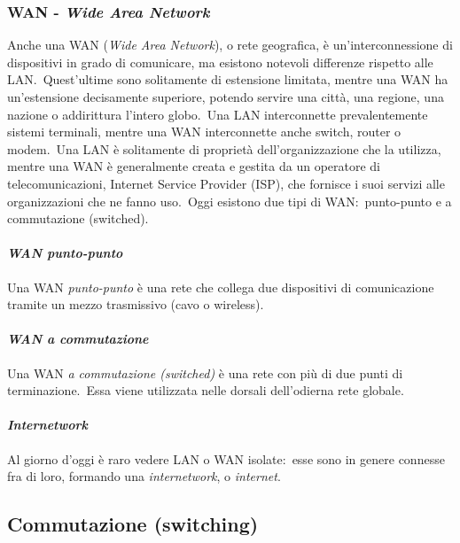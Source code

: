 \subsubsection{WAN - \emph{Wide Area Network}}

Anche una WAN (\emph{Wide Area Network}), o rete geografica, è un'interconnessione di dispositivi in grado di comunicare, ma esistono notevoli differenze rispetto alle LAN.\
Quest'ultime sono solitamente di estensione limitata, mentre una WAN ha un'estensione decisamente superiore, potendo servire una città, una regione, una nazione o addirittura l'intero globo.\
Una LAN interconnette prevalentemente sistemi terminali, mentre una WAN interconnette anche switch, router o modem.\
Una LAN è solitamente di proprietà dell'organizzazione che la utilizza, mentre una WAN è generalmente creata e gestita da un operatore di telecomunicazioni, Internet Service Provider (ISP), che fornisce i suoi servizi alle organizzazioni che ne fanno uso.\
Oggi esistono due tipi di WAN:\ punto-punto e a commutazione (switched).

\paragraph{\emph{WAN punto-punto}}

Una WAN \emph{punto-punto} è una rete che collega due dispositivi di comunicazione tramite un mezzo trasmissivo (cavo o wireless).

\paragraph{\emph{WAN a commutazione}}

Una WAN \emph{a commutazione (switched)} è una rete con più di due punti di terminazione.\
Essa viene utilizzata nelle dorsali dell'odierna rete globale.

\paragraph{\emph{Internetwork}}

Al giorno d'oggi è raro vedere LAN o WAN isolate:\ esse sono in genere connesse fra di loro, formando una \emph{internetwork}, o \emph{internet}.

\subsection{Commutazione (switching)}

